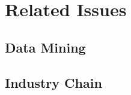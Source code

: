 \section{Related Issues} %
\label{sec:problem}
\subsection{Data Mining} %
\label{sub:data_mining}


\subsection{Industry Chain} %
\label{sub:industry_chain}

